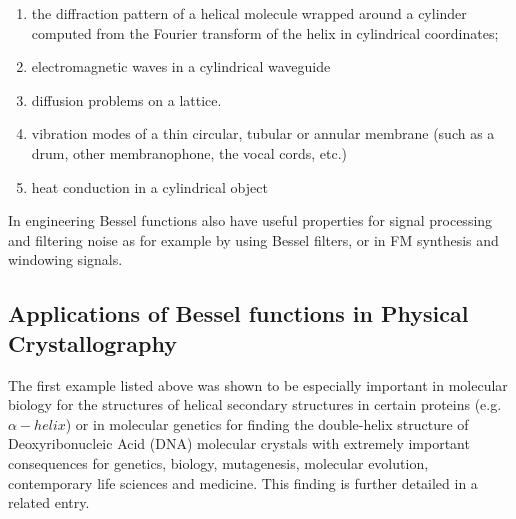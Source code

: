 \documentclass[12pt]{article}
\theoremstyle{plain}
\theoremstyle{definition}
\numberwithin{equation}{section}
\begin{document}
\begin{enumerate}
\item the diffraction pattern of a helical molecule wrapped around a cylinder computed from the Fourier transform of the helix in cylindrical coordinates;
\item electromagnetic waves in a cylindrical waveguide 
\item diffusion problems on a lattice. 
\item vibration modes of a thin circular, tubular or annular membrane (such as a drum, other membranophone, the vocal cords, etc.)
\item heat conduction in a cylindrical object   
\end{enumerate}

In engineering Bessel functions also have useful properties for signal processing and filtering noise as for example by using Bessel filters, or in FM synthesis and windowing signals.

\subsection{Applications of Bessel functions in Physical Crystallography}
The first example listed above was shown to be especially important in molecular
biology for the structures of helical secondary structures in certain proteins (e.g. $\alpha-helix$) or in molecular genetics for finding the double-helix
structure of Deoxyribonucleic Acid (DNA) molecular crystals with extremely important consequences for genetics, biology, mutagenesis, molecular evolution,
contemporary life sciences and medicine. This finding is further detailed in a related entry.
\end{document}
